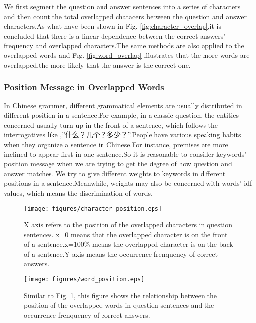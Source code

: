 \documentclass{llncs}
\begin{document}
We first segment the question and answer sentences into a series of characters and then count the total overlapped chatacers between the question and answer characters.As what have been shown in Fig. \ref{fig:character_overlap},it is concluded that there is a linear dependence between the correct answers’ frequency and overlapped characters.The same methods are also applied to the overlapped words and Fig. \ref{fig:word_overlap} illustrates that the more words are overlapped,the more likely that the answer is the correct one.

\subsubsection{Position Message in Overlapped Words}
In Chinese grammer, different grammatical elements are usually distributed in different position in a sentence.For example, in a classic question, the entities concerned usually turn up in the front of a sentence, which follows the interrogatives like ,”什么？几个？多少？”.People have various speaking habits when they organize a sentence in Chinese.For instance, premises are more inclined to appear first in one sentence.So it is reasonable to consider keywords’ position message when we are trying to get the degree of how question and answer matches. We try to give different weights to keywords in different positions in a sentence.Meanwhile, weights may also be concerned with words’ idf values, which means the discrimination of words.


\begin{figure}
\centering
\texttt{[image: figures/character\_position.eps]}
\caption{X axis refers to the position of the overlapped characters in question sentences. x=0 means that the overlapped character is on the front of  a sentence.x=100\% means the overlapped character is on the back of a sentence.Y axis means the occurrence frenquency of correct answers.}
\label{fig:character_position}
\end{figure}

\begin{figure}
\centering
\texttt{[image: figures/word\_position.eps]}
\caption{Similar to Fig. \ref{fig:character_position}, this figure shows the relationship between the position of the overlapped words in question sentences and the occurrence frenquency of correct answers.}
\label{fig:word_position}
\end{figure}
\end{document}
